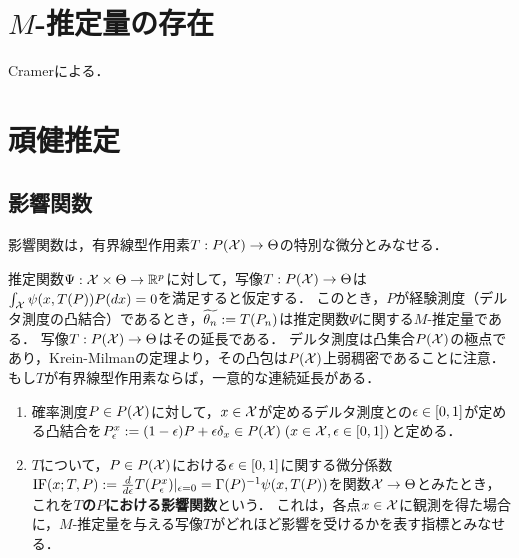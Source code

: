 \documentclass[uplatex,dvipdfmx]{jsreport}
\begin{document}
\section{$M$-推定量の存在}

\begin{tcolorbox}[colframe=ForestGreen, colback=ForestGreen!10!white,breakable,colbacktitle=ForestGreen!40!white,coltitle=black,fonttitle=\bfseries\sffamily,
title=]
    Cramerによる．
\end{tcolorbox}

\section{頑健推定}

\subsection{影響関数}

\begin{tcolorbox}[colframe=ForestGreen, colback=ForestGreen!10!white,breakable,colbacktitle=ForestGreen!40!white,coltitle=black,fonttitle=\bfseries\sffamily,
title=]
    影響関数は，有界線型作用素$T:P(\mathcal{X})\to\Theta$の特別な微分とみなせる．
\end{tcolorbox}

\begin{notation}
    推定関数$\Psi:\mathcal{X}\times\Theta\to\mathbb{R}^p$に対して，写像$T:P(\mathcal{X})\to\Theta$は$\int_{\mathcal{X}}\psi(x,T(P))P(dx)=0$を満足すると仮定する．
    このとき，$P$が経験測度（デルタ測度の凸結合）であるとき，$\widetilde{\theta_n}:=T(P_n)$は推定関数$\Psi$に関する$M$-推定量である．
    写像$T:P(\mathcal{X})\to\Theta$はその延長である．
    デルタ測度は凸集合$P(\mathcal{X})$の極点であり，Krein-Milmanの定理より，その凸包は$P(\mathcal{X})$上弱稠密であることに注意．
    もし$T$が有界線型作用素ならば，一意的な連続延長がある．
\end{notation}

\begin{definition}\mbox{}
    \begin{enumerate}
        \item 確率測度$P\in P(\mathcal{X})$に対して，$x\in\mathcal{X}$が定めるデルタ測度との$\epsilon\in[0,1]$が定める凸結合を$P^x_\epsilon:=(1-\epsilon)P+\epsilon\delta_x\in P(\mathcal{X})\;(x\in\mathcal{X},\epsilon\in[0,1])$と定める．
        \item $T$について，$P\in P(\mathcal{X})$における$\epsilon\in[0,1]$に関する微分係数$\mathrm{IF}(x;T,P):=\frac{d }{d \epsilon}T(P^x_\epsilon)|_{\epsilon=0}=\Gamma(P)^{-1}\psi(x,T(P))$を関数$\mathcal{X}\to\Theta$とみたとき，これを\textbf{$T$の$P$における影響関数}という．
        これは，各点$x\in\mathcal{X}$に観測を得た場合に，$M$-推定量を与える写像$T$がどれほど影響を受けるかを表す指標とみなせる．
    \end{enumerate}
\end{definition}
\end{document}

